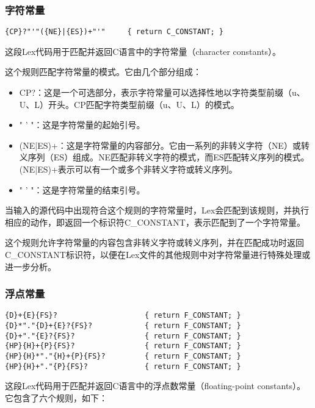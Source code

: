 \documentclass[lang=cn,11pt,a4paper]{elegantpaper}
\begin{document}
\subsubsection{字符常量}

\begin{lstlisting}
{CP}?"'"({NE}|{ES})+"'"		{ return C_CONSTANT; }
\end{lstlisting}

这段Lex代码用于匹配并返回C语言中的字符常量（character constants）。

这个规则匹配字符常量的模式。它由几个部分组成：
\begin{itemize}
    \item {CP}?：这是一个可选部分，表示字符常量可以选择性地以字符类型前缀（u、U、L）开头。{CP}匹配字符类型前缀（u、U、L）的模式。
    \item " ' "：这是字符常量的起始引号。
    \item ({NE}|{ES})+：这是字符常量的内容部分。它由一系列的非转义字符（{NE}）或转义序列（{ES}）组成。{NE}匹配非转义字符的模式，而{ES}匹配转义序列的模式。({NE}|{ES})+表示可以有一个或多个非转义字符或转义序列。
    \item " ' "：这是字符常量的结束引号。
\end{itemize}

当输入的源代码中出现符合这个规则的字符常量时，Lex会匹配到该规则，并执行相应的动作，即返回一个标识符C\_CONSTANT，表示匹配到了一个字符常量。

这个规则允许字符常量的内容包含非转义字符或转义序列，并在匹配成功时返回C\_CONSTANT标识符，以便在Lex文件的其他规则中对字符常量进行特殊处理或进一步分析。

\subsubsection{浮点常量}

\begin{lstlisting}
{D}+{E}{FS}?		    		{ return F_CONSTANT; }
{D}*"."{D}+{E}?{FS}?			{ return F_CONSTANT; }
{D}+"."{E}?{FS}?		    	{ return F_CONSTANT; }
{HP}{H}+{P}{FS}?		    	{ return F_CONSTANT; }
{HP}{H}*"."{H}+{P}{FS}?			{ return F_CONSTANT; }
{HP}{H}+"."{P}{FS}?		    	{ return F_CONSTANT; }
\end{lstlisting}

这段Lex代码用于匹配并返回C语言中的浮点数常量（floating-point constants）。它包含了六个规则，如下：
\end{document}
